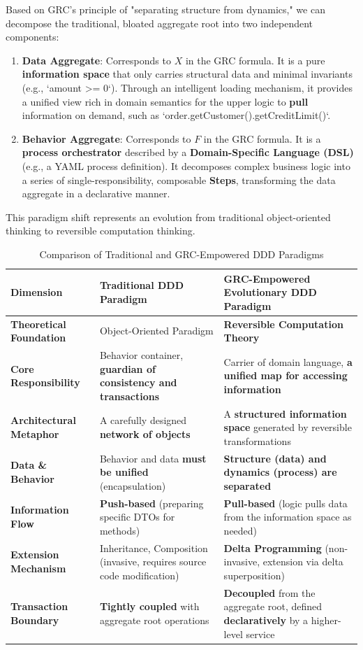 \documentclass[11pt]{article}
\begin{document}
Based on GRC's principle of "separating structure from dynamics," we can decompose the traditional, bloated aggregate root into two independent components:
\begin{enumerate}
    \item \textbf{Data Aggregate}: Corresponds to $X$ in the GRC formula. It is a pure \textbf{information space} that only carries structural data and minimal invariants (e.g., `amount >= 0`). Through an intelligent loading mechanism, it provides a unified view rich in domain semantics for the upper logic to \textbf{pull} information on demand, such as `order.getCustomer().getCreditLimit()`.
    \item \textbf{Behavior Aggregate}: Corresponds to $F$ in the GRC formula. It is a \textbf{process orchestrator} described by a \textbf{Domain-Specific Language (DSL)} (e.g., a YAML process definition). It decomposes complex business logic into a series of single-responsibility, composable \textbf{Steps}, transforming the data aggregate in a declarative manner.
\end{enumerate}

This paradigm shift represents an evolution from traditional object-oriented thinking to reversible computation thinking.

\begin{table}[htbp]
\centering
\caption{Comparison of Traditional and GRC-Empowered DDD Paradigms}
\begin{tabularx}{\textwidth}{@{} l X X @{}}
\toprule
\textbf{Dimension} & \textbf{Traditional DDD Paradigm} & \textbf{GRC-Empowered Evolutionary DDD Paradigm} \\
\midrule
\textbf{Theoretical Foundation} & Object-Oriented Paradigm & \textbf{Reversible Computation Theory} \\
\addlinespace
\textbf{Core Responsibility} & Behavior container, \textbf{guardian of consistency and transactions} & Carrier of domain language, \textbf{a unified map for accessing information} \\
\addlinespace
\textbf{Architectural Metaphor} & A carefully designed \textbf{network of objects} & A \textbf{structured information space} generated by reversible transformations \\
\addlinespace
\textbf{Data \& Behavior} & Behavior and data \textbf{must be unified} (encapsulation) & \textbf{Structure (data) and dynamics (process) are separated} \\
\addlinespace
\textbf{Information Flow} & \textbf{Push-based} (preparing specific DTOs for methods) & \textbf{Pull-based} (logic pulls data from the information space as needed) \\
\addlinespace
\textbf{Extension Mechanism} & Inheritance, Composition (invasive, requires source code modification) & \textbf{Delta Programming} (non-invasive, extension via delta superposition) \\
\addlinespace
\textbf{Transaction Boundary} & \textbf{Tightly coupled} with aggregate root operations & \textbf{Decoupled} from the aggregate root, defined \textbf{declaratively} by a higher-level service \\
\bottomrule
\end{tabularx}
\end{table}
\end{document}
